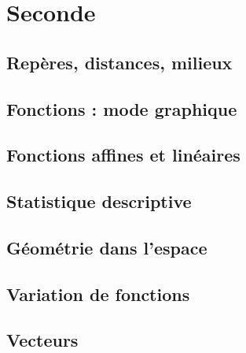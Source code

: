 \documentclass[a4paper,12pt]{book}
\begin{document}



\newpage



\tableofcontents

\newpage

\part{Seconde}

\chapter{Repères, distances, milieux}


\chapter{Fonctions : mode graphique}


\chapter{Fonctions affines et linéaires}


\chapter{Statistique descriptive}


\chapter{Géométrie dans l'espace}


\chapter{Variation de fonctions}

\chapter{Vecteurs}

\end{document}
